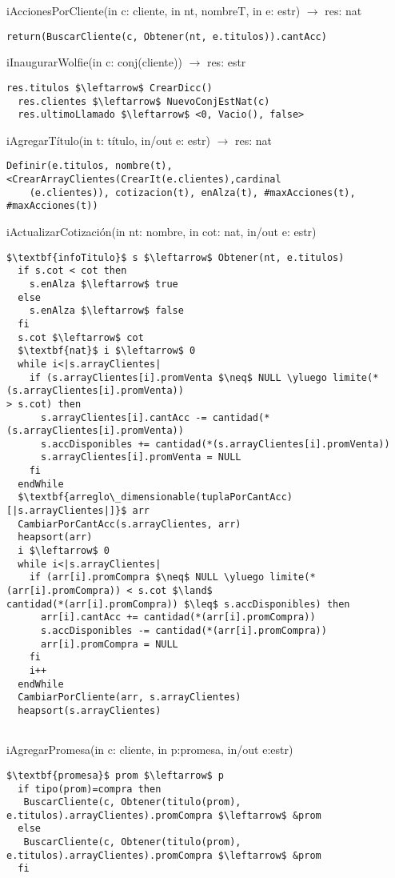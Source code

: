 iAccionesPorCliente(in c: cliente, in nt, nombreT, in e: estr) $\rightarrow$ res: nat
\begin{lstlisting}[mathescape]
  return(BuscarCliente(c, Obtener(nt, e.titulos)).cantAcc)
\end{lstlisting}

iInaugurarWolfie(in c: conj(cliente)) $\rightarrow$ res: estr
\begin{lstlisting}[mathescape]
  res.titulos $\leftarrow$ CrearDicc()
  res.clientes $\leftarrow$ NuevoConjEstNat(c)
  res.ultimoLlamado $\leftarrow$ <0, Vacio(), false>
\end{lstlisting}

iAgregarT\'itulo(in t: t\'itulo, in/out e: estr) $\rightarrow$ res: nat
\begin{lstlisting}[mathescape]
  Definir(e.titulos, nombre(t), <CrearArrayClientes(CrearIt(e.clientes),cardinal
  	(e.clientes)), cotizacion(t), enAlza(t), #maxAcciones(t), #maxAcciones(t))
\end{lstlisting}

iActualizarCotizaci\'on(in nt: nombre, in cot: nat, in/out e: estr)
\begin{lstlisting}[mathescape]
  $\textbf{infoTitulo}$ s $\leftarrow$ Obtener(nt, e.titulos)
  if s.cot < cot then 
  	s.enAlza $\leftarrow$ true 
  else 
  	s.enAlza $\leftarrow$ false
  fi
  s.cot $\leftarrow$ cot
  $\textbf{nat}$ i $\leftarrow$ 0
  while i<|s.arrayClientes|
    if (s.arrayClientes[i].promVenta $\neq$ NULL \yluego limite(*(s.arrayClientes[i].promVenta))
> s.cot) then
      s.arrayClientes[i].cantAcc -= cantidad(*(s.arrayClientes[i].promVenta))
      s.accDisponibles += cantidad(*(s.arrayClientes[i].promVenta))
      s.arrayClientes[i].promVenta = NULL
    fi
  endWhile
  $\textbf{arreglo\_dimensionable(tuplaPorCantAcc)[|s.arrayClientes|]}$ arr
  CambiarPorCantAcc(s.arrayClientes, arr)
  heapsort(arr)
  i $\leftarrow$ 0
  while i<|s.arrayClientes|
    if (arr[i].promCompra $\neq$ NULL \yluego limite(*(arr[i].promCompra)) < s.cot $\land$ 
cantidad(*(arr[i].promCompra)) $\leq$ s.accDisponibles) then  
      arr[i].cantAcc += cantidad(*(arr[i].promCompra))
      s.accDisponibles -= cantidad(*(arr[i].promCompra))
      arr[i].promCompra = NULL
    fi
    i++
  endWhile
  CambiarPorCliente(arr, s.arrayClientes)
  heapsort(s.arrayClientes)
  
\end{lstlisting}

iAgregarPromesa(in c: cliente, in p:promesa, in/out e:estr)
\begin{lstlisting}[mathescape]
  $\textbf{promesa}$ prom $\leftarrow$ p
  if tipo(prom)=compra then
   BuscarCliente(c, Obtener(titulo(prom), e.titulos).arrayClientes).promCompra $\leftarrow$ &prom
  else
   BuscarCliente(c, Obtener(titulo(prom), e.titulos).arrayClientes).promCompra $\leftarrow$ &prom
  fi
\end{lstlisting}

